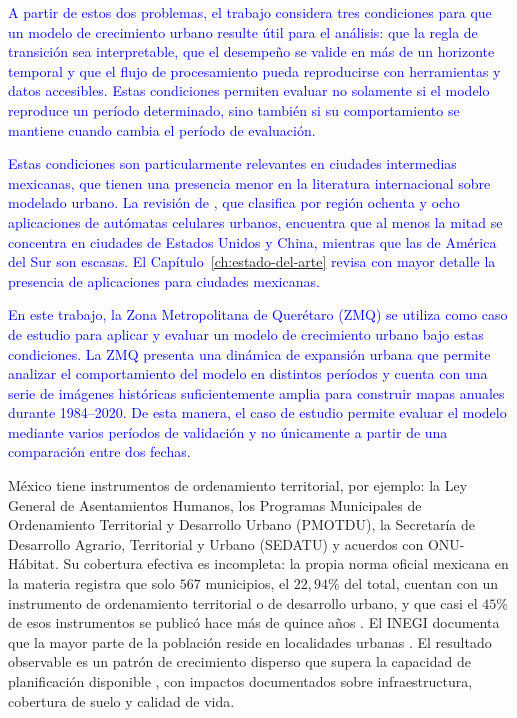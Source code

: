 \textcolor{blue}{A partir de estos dos problemas, el trabajo considera tres condiciones para que un modelo de crecimiento urbano resulte útil para el análisis: que la regla de transición sea interpretable, que el desempeño se valide en más de un horizonte temporal y que el flujo de procesamiento pueda reproducirse con herramientas y datos accesibles. Estas condiciones permiten evaluar no solamente si el modelo reproduce un período determinado, sino también si su comportamiento se mantiene cuando cambia el período de evaluación.}

\textcolor{blue}{Estas condiciones son particularmente relevantes en ciudades intermedias mexicanas, que tienen una presencia menor en la literatura internacional sobre modelado urbano. La revisión de \textcite{Wahyudi2016}, que clasifica por región ochenta y ocho aplicaciones de autómatas celulares urbanos, encuentra que al menos la mitad se concentra en ciudades de Estados Unidos y China, mientras que las de América del Sur son escasas. El Capítulo~\ref{ch:estado-del-arte} revisa con mayor detalle la presencia de aplicaciones para ciudades mexicanas.}

\textcolor{blue}{En este trabajo, la Zona Metropolitana de Querétaro (ZMQ) se utiliza como caso de estudio para aplicar y evaluar un modelo de crecimiento urbano bajo estas condiciones. La ZMQ presenta una dinámica de expansión urbana que permite analizar el comportamiento del modelo en distintos períodos y cuenta con una serie de imágenes históricas suficientemente amplia para construir mapas anuales durante 1984--2020. De esta manera, el caso de estudio permite evaluar el modelo mediante varios períodos de validación y no únicamente a partir de una comparación entre dos fechas.}

México tiene instrumentos de ordenamiento territorial, por ejemplo: la Ley General de Asentamientos Humanos, los Programas Municipales de Ordenamiento Territorial y Desarrollo Urbano (PMOTDU), la Secretaría de Desarrollo Agrario, Territorial y Urbano (SEDATU) y acuerdos con ONU-Hábitat. Su cobertura efectiva es incompleta: la propia norma oficial mexicana en la materia registra que solo $567$ municipios, el $22{,}94$\% del total, cuentan con un instrumento de ordenamiento territorial o de desarrollo urbano, y que casi el $45$\% de esos instrumentos se publicó hace más de quince años \parencite{SEDATU2024NOM005}. El INEGI documenta que la mayor parte de la población reside en localidades urbanas \parencite{INEGI2020Censo}. El resultado observable es un patrón de crecimiento disperso que supera la capacidad de planificación disponible \parencite{ONUHabitat2016TendenciasMexico}, con impactos documentados sobre infraestructura, cobertura de suelo y calidad de vida.

